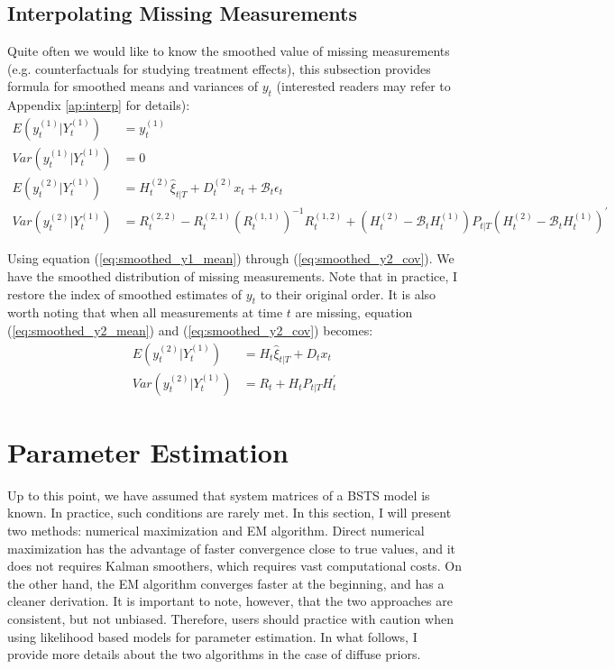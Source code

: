 \documentclass[10pt, titlepage]{article}
\numberwithin{equation}{section}
\begin{document}
\subsection{Interpolating Missing Measurements}
Quite often we would like to know the smoothed value of missing measurements (e.g. counterfactuals for studying treatment effects), this subsection provides formula for smoothed means and variances of $y_t$ (interested readers may refer to Appendix \ref{ap:interp} for details):
\begin{align}
    E(y_t^{(1)}|Y_t^{(1)}) &= y_t^{(1)} \label{eq:smoothed_y1_mean} \\
    Var(y_t^{(1)}|Y_t^{(1)}) &= 0 \\
    E(y_t^{(2)}|Y_t^{(1)}) &= H_t^{(2)}\hat{\xi}_{t|T} + D_t^{(2)}x_t + \mathcal{B}_t\epsilon_t \label{eq:smoothed_y2_mean} \\
    Var(y_t^{(2)}|Y_t^{(1)}) &= R_t^{(2, 2)} - R_t^{(2, 1)}\left(R_t^{(1, 1)}\right)^{-1}R_t^{(1, 2)} + 
        \left(H_t^{(2)}-\mathcal{B}_tH_t^{(1)}\right)P_{t|T}\left(H_t^{(2)}-\mathcal{B}_tH_t^{(1)}\right)^{'} \label{eq:smoothed_y2_cov}
\end{align}

Using equation (\ref{eq:smoothed_y1_mean}) through (\ref{eq:smoothed_y2_cov}). We have the smoothed distribution of missing measurements. Note that in practice, I restore the index of smoothed estimates of $y_t$ to their original order. It is also worth noting that when all measurements at time $t$ are missing, equation (\ref{eq:smoothed_y2_mean}) and (\ref{eq:smoothed_y2_cov}) becomes:
\begin{align*}
    E(y_t^{(2)}|Y_t^{(1)}) &= H_t\hat{\xi}_{t|T} + D_tx_t \\
    Var(y_t^{(2)}|Y_t^{(1)}) &= R_t + H_tP_{t|T}H_t^{'} 
\end{align*}

\section{Parameter Estimation} \label{sec:param}
Up to this point, we have assumed that system matrices of a BSTS model is known. In practice, such conditions are rarely met. In this section, I will present two methods: numerical maximization and EM algorithm. Direct numerical maximization has the advantage of faster convergence close to true values, and it does not requires Kalman smoothers, which requires vast computational costs. On the other hand, the EM algorithm converges faster at the beginning, and has a cleaner derivation. It is important to note, however, that the two approaches are consistent, but not unbiased. Therefore, users should practice with caution when using likelihood based models for parameter estimation. In what follows, I provide more details about the two algorithms in the case of diffuse priors.
\end{document}
